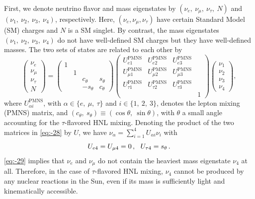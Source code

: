 \documentclass[aps,prd,twocolumn,preprintnumbers,superscriptaddress,nofootinbib]{revtex4-1}
\begin{document}
First, we denote neutrino flavor and mass eigenstates by $(\nu_{e},\ \nu_{\mu},\ \nu_{\tau},\ N)$
and $(\nu_{1},\ \nu_{2},\ \nu_{3},\ \nu_{4})$, respectively. Here,
$(\nu_{e},\nu_{\mu},\nu_{\tau})$ have certain Standard Model (SM) charges and $N$
is a SM singlet. By contrast, the mass eigenstates $(\nu_{1},\ \nu_{2},\ \nu_{3},\ \nu_{4})$
do not have well-defined SM charges but they have well-defined masses.
 The two sets of states are related to each other by 
\begin{equation}
\left(\begin{array}{c}
\nu_{e}\\
\nu_{\mu}\\
\nu_{\tau}\\
N
\end{array}\right)=\left(\begin{array}{cccc}
1\\
 & 1\\
 &  & c_{\theta} & s_{\theta}\\
 &  & -s_{\theta} & c_{\theta}
\end{array}\right)\left(\begin{array}{cccc}
U_{e1}^{\text{PMNS}} & U_{e2}^{\text{PMNS}} & U_{e3}^{\text{PMNS}}\\
U_{\mu1}^{\text{PMNS}} & U_{\mu2}^{\text{PMNS}} & U_{\mu3}^{\text{PMNS}}\\
U_{\tau1}^{\text{PMNS}} & U_{\tau2}^{\text{PMNS}} & U_{\tau3}^{\text{PMNS}}\\
 &  &  & 1
\end{array}\right)\left(\begin{array}{c}
\nu_{1}\\
\nu_{2}\\
\nu_{3}\\
\nu_{4}
\end{array}\right),\label{eq:-28}
\end{equation}
where $U_{\alpha i}^{\text{PMNS}}$, with $\alpha\in\{e,\ \mu,\ \tau\}$
and $i\in\{1,\ 2,\ 3\}$, denotes the lepton mixing (PMNS) matrix, and $(c_{\theta},\ s_{\theta})\equiv(\cos\theta,\ \sin\theta)$,
with $\theta$ a small angle accounting for the $\tau$-flavored HNL
mixing. Denoting the product of the two matrices in \cref{eq:-28}
by $U$, we have $\nu_{\alpha}=\sum_{i=1}^{4}U_{\alpha i}\nu_{i}$
with 
\begin{equation}
U_{e4}=U_{\mu4}=0\thinspace,\ \ U_{\tau4}=s_{\theta}\thinspace.\label{eq:-29}
\end{equation}
\cref{eq:-29} implies that $\nu_{e}$ and $\nu_{\mu}$ do not
contain the heaviest mass eigenstate $\nu_{4}$ at all. Therefore,
in the case of $\tau$-flavored HNL mixing, $\nu_{4}$ cannot be produced
by any nuclear reactions in the Sun,  even if its mass is sufficiently
light and kinematically accessible. 
\end{document}
